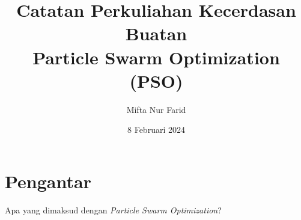 \documentclass[10pt,a4paper]{article}
\title{Catatan Perkuliahan Kecerdasan Buatan\\Particle Swarm Optimization (PSO)}
\author{Mifta Nur Farid}
\date{8 Februari 2024}
\begin{document}
	\maketitle
	\section{Pengantar}
	Apa yang dimaksud dengan \emph{Particle Swarm Optimization}?
\end{document}
